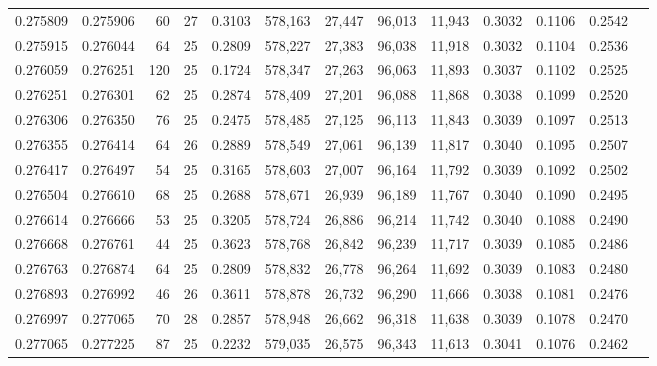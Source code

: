 \begin{tabular}{rrrrrrrrrrrrr}
0.275809 & 0.275906 &  60 &  27 &                                     0.3103 & 578,163 &  27,447 &  96,013 &  11,943 & 0.3032 & 0.1106 & 0.2542 \\
0.275915 & 0.276044 &  64 &  25 &                                     0.2809 & 578,227 &  27,383 &  96,038 &  11,918 & 0.3032 & 0.1104 & 0.2536 \\
0.276059 & 0.276251 & 120 &  25 &                                     0.1724 & 578,347 &  27,263 &  96,063 &  11,893 & 0.3037 & 0.1102 & 0.2525 \\
0.276251 & 0.276301 &  62 &  25 &                                     0.2874 & 578,409 &  27,201 &  96,088 &  11,868 & 0.3038 & 0.1099 & 0.2520 \\
0.276306 & 0.276350 &  76 &  25 &                                     0.2475 & 578,485 &  27,125 &  96,113 &  11,843 & 0.3039 & 0.1097 & 0.2513 \\
0.276355 & 0.276414 &  64 &  26 &                                     0.2889 & 578,549 &  27,061 &  96,139 &  11,817 & 0.3040 & 0.1095 & 0.2507 \\
0.276417 & 0.276497 &  54 &  25 &                                     0.3165 & 578,603 &  27,007 &  96,164 &  11,792 & 0.3039 & 0.1092 & 0.2502 \\
0.276504 & 0.276610 &  68 &  25 &                                     0.2688 & 578,671 &  26,939 &  96,189 &  11,767 & 0.3040 & 0.1090 & 0.2495 \\
0.276614 & 0.276666 &  53 &  25 &                                     0.3205 & 578,724 &  26,886 &  96,214 &  11,742 & 0.3040 & 0.1088 & 0.2490 \\
0.276668 & 0.276761 &  44 &  25 &                                     0.3623 & 578,768 &  26,842 &  96,239 &  11,717 & 0.3039 & 0.1085 & 0.2486 \\
0.276763 & 0.276874 &  64 &  25 &                                     0.2809 & 578,832 &  26,778 &  96,264 &  11,692 & 0.3039 & 0.1083 & 0.2480 \\
0.276893 & 0.276992 &  46 &  26 &                                     0.3611 & 578,878 &  26,732 &  96,290 &  11,666 & 0.3038 & 0.1081 & 0.2476 \\
0.276997 & 0.277065 &  70 &  28 &                                     0.2857 & 578,948 &  26,662 &  96,318 &  11,638 & 0.3039 & 0.1078 & 0.2470 \\
0.277065 & 0.277225 &  87 &  25 &                                     0.2232 & 579,035 &  26,575 &  96,343 &  11,613 & 0.3041 & 0.1076 & 0.2462 \\

\end{tabular}
